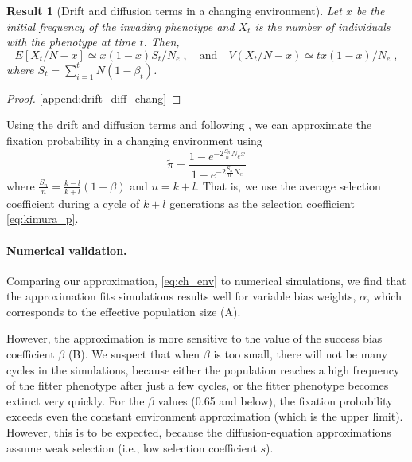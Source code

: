 \documentclass[12pt]{extarticle}
\newtheorem{result}{Result}
\begin{document}
\begin{result} [Drift and diffusion terms in a changing environment]\label{res:ch_expected}
Let $x$ be the initial frequency of the invading phenotype and $X_t$ is the number of individuals with the phenotype at time $t$.
Then,
\begin{equation}\label{eq:ch_expected_and_var}
E[X_t/N - x] \simeq x(1-x) S_t / N_e \;, 
\quad
\text{and}
\quad
V(X_t/N-x) \simeq  t x(1-x) / N_e \;,
\end{equation}
where $S_t=\sum\limits_{i=1}^{t} N (1-\beta_t)$.
\end{result}

\begin{proof}
\cref{append:drift_diff_chang}
\end{proof}


Using the drift and diffusion terms and following \citet{changeEnv}, we can approximate the fixation probability in a changing environment using
\begin{equation}\label{eq:ch_env}
\tilde\pi = \frac{1-e^{-2 \frac{S_n}{n} N_e x}}{1-e^{-2 \frac{S_n}{n} N_e}}
\end{equation}
where $\frac{S_n}{n} = \frac{k-l}{k+l}(1-\beta)$ and $n=k+l$.
That is, we use the average selection coefficient during a cycle of $k+l$ generations as the selection coefficient \cref{eq:kimura_p}.

\paragraph{Numerical validation.}
Comparing our approximation, \cref{eq:ch_env} to numerical simulations, we find that the approximation fits simulations results well for variable bias weights, $\alpha$, which corresponds to the effective population size (A).

However, the approximation is more sensitive to the value of the success bias coefficient $\beta$ (B).
We suspect that when $\beta$ is too small, there will not be many cycles in the simulations, because either the population reaches a high frequency of the fitter phenotype after just a few cycles, or the fitter phenotype becomes extinct very quickly. 
For the $\beta$ values (0.65 and below), the fixation probability exceeds even the constant environment approximation (which is the upper limit). However, this is to be expected, because the diffusion-equation approximations assume weak selection (i.e., low selection coefficient $s$).
\end{document}
